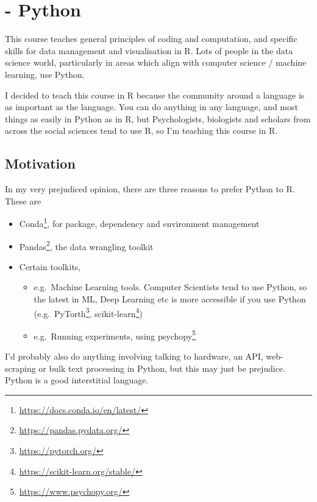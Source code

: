\documentclass[
  12pt,
  a5paper,
]{book}
\DeclareRobustCommand{\href}[2]{#2\footnote{\url{#1}}}
\providecommand{\tightlist}{%
  \setlength{\itemsep}{0pt}\setlength{\parskip}{0pt}}
\begin{document}
\hypertarget{python}{%
\chapter*{- Python}\label{python}}


This course teaches general principles of coding and computation, and specific skills for data management and visualisation in R. Lots of people in the data science world, particularly in areas which align with computer science / machine learning, use Python.

I decided to teach this course in R because the community around a language is as important as the language. You can do anything in any language, and most things as easily in Python as in R, but Psychologists, biologists and scholars from across the social sciences tend to use R, so I'm teaching this course in R.

\hypertarget{motivation-2}{%
\section{Motivation}\label{motivation-2}}

In my very prejudiced opinion, there are three reasons to prefer Python to R. These are

\begin{itemize}
\tightlist
\item
  \href{https://docs.conda.io/en/latest/}{Conda}, for package, dependency and environment management
\item
  \href{https://pandas.pydata.org/}{Pandas}, the data wrangling toolkit
\item
  Certain toolkits,

  \begin{itemize}
  \tightlist
  \item
    e.g.~Machine Learning tools. Computer Scientists tend to use Python, so the latest in ML, Deep Learning etc is more accessible if you use Python (e.g.~\href{https://pytorch.org/}{PyTorth}, \href{https://scikit-learn.org/stable/}{scikit-learn})
  \item
    e.g.~Running experiments, using \href{https://www.psychopy.org/}{psychopy}
  \end{itemize}
\end{itemize}

I'd probably also do anything involving talking to hardware, an API, web-scraping or bulk text processing in Python, but this may just be prejudice. Python is a good interstitial language.
\end{document}
